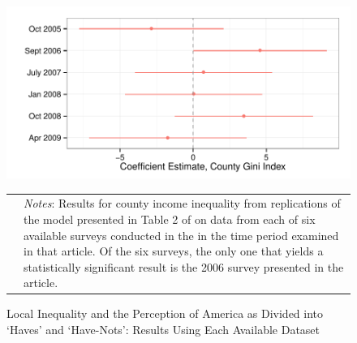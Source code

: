 \begin{figure}[htbp] 
  \caption{Local Inequality and the Perception of America as Divided into `Haves' and `Have-Nots': Results Using Each Available Dataset}
  \label{F:t2_by_survey}
  \begin{center}
    \includegraphics[width=5.25in]{../figures/03_examine_all_available_data_t2_by_survey.pdf}
  \end{center}
  \begin{footnotesize}
  \begin{tabular}{p{.1in} p{5.1in}}
  & \emph{Notes}: Results for county income inequality from replications of the model presented in Table 2 of \citet{Newman2015} on data from each of six available surveys conducted in the in the time period examined in that article.  Of the six surveys, the only one that yields a statistically significant result is the 2006 survey presented in the article.
  \end{tabular}
  \end{footnotesize}
\end{figure}



